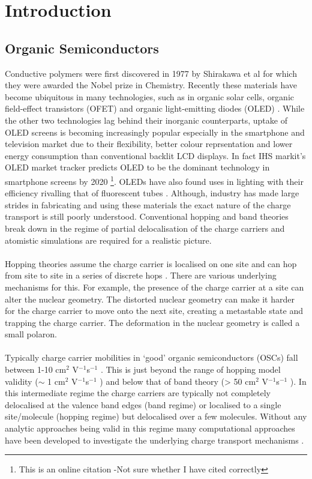 \chapter{Introduction}
\label{chapterlabel1}
\section{Organic Semiconductors}
Conductive polymers were first discovered in 1977 by Shirakawa et al  \cite{chiang_electrical_1977, Shirakawa1977Jan} for which they were awarded the Nobel prize in Chemistry. Recently these materials have become ubiquitous in many technologies, such as in organic solar cells\cite{Kippelen2009}, organic field-effect transistors (OFET) \cite{Malachowski2010Jun} and organic light-emitting diodes (OLED) \cite{ThejoKalyani2012Jun}. While the other two technologies lag behind their inorganic counterparts, uptake of OLED screens is becoming increasingly popular especially in the smartphone and television market due to their flexibility, better colour reprsentation and lower energy consumption than conventional backlit LCD displays. In fact IHS markit's OLED market tracker predicts OLED to be the dominant technology in smartphone screens by 2020 \cite{IHSMarkit} \footnote{This is an online citation -Not sure whether I have cited correctly}. OLEDs have also found uses in lighting with their efficiency rivalling that of fluorescent tubes \cite{Reineke2009May, OLED_lighting}. Although, industry has made large strides in fabricating and using these materials the exact nature of the charge transport is still poorly understood. Conventional hopping and band theories break down in the regime of partial delocalisation of the charge carriers and atomistic simulations are required for a realistic picture.
\\\\
Hopping theories assume the charge carrier is localised on one site and can hop from site to site in a series of discrete hops \cite{oberhofer_charge_2017}. There are various underlying mechanisms for this. For example, the presence of the charge carrier at a site can alter the nuclear geometry. The distorted nuclear geometry can make it harder for the charge carrier to move onto the next site, creating a metastable state and trapping the charge carrier. The deformation in the nuclear geometry is called a small polaron.
\\\\
Typically charge carrier mobilities in `good' organic semiconductors (OSCs) fall between 1-10 cm$^2$ V$^{-1}$s$^{-1}$ \cite{yavuz_dichotomy_2017}. This is just beyond the range of hopping model validity ($\sim $ 1 cm$^2$ V$^{-1}$s$^{-1}$ ) and below that of band theory (> 50 cm$^2$ V$^{-1}$s$^{-1}$ ). In this intermediate regime the charge carriers are typically not completely delocalised at the valence band edges (band regime) or localised to a single site/molecule (hopping regime) but delocalised over a few molecules. Without any analytic approaches being valid in this regime many computational approaches have been developed to investigate the underlying charge transport mechanisms \cite{oberhofer_charge_2017}.


